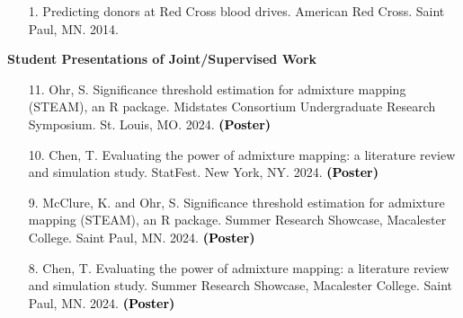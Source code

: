\documentclass[margin]{res}
\newcommand{\annotate}[1]{\textcolor{black}{\textbf{(#1)}}}
\newcommand{\annotateItem}[1]{
	\begin{itemize} \vspace{-0.1cm}
	\item[] 
	\begin{footnotesize}\textcolor{black}{(#1)}\end{footnotesize}
	\end{itemize} \vspace{-0.1cm}
}
\begin{document}
\begin{resume}
\begin{itemize}
\item[1.] %
Predicting donors at Red Cross blood drives. 
American Red Cross. Saint Paul, MN. 2014.%


\end{itemize}



\textbf{Student Presentations of Joint/Supervised Work}

\begin{itemize}


\item[11.] Ohr, S. 
Significance threshold estimation for admixture mapping (STEAM), an R package. 
Midstates Consortium Undergraduate Research Symposium. St. Louis, MO. 2024. 
\annotate{Poster}

\item[10.] Chen, T. 
Evaluating the power of admixture mapping: a literature review and simulation study. 
StatFest. New York, NY. 2024. 
\annotate{Poster}

\item[9.] McClure, K. and Ohr, S. 
Significance threshold estimation for admixture mapping (STEAM), an R package. 
Summer Research Showcase, Macalester College. Saint Paul, MN. 2024. 
\annotate{Poster}%

\item[8.] Chen, T. 
Evaluating the power of admixture mapping: a literature review and simulation study. 
Summer Research Showcase, Macalester College. Saint Paul, MN. 2024. 
\annotate{Poster}



\end{itemize}
\end{resume}
\end{document}
